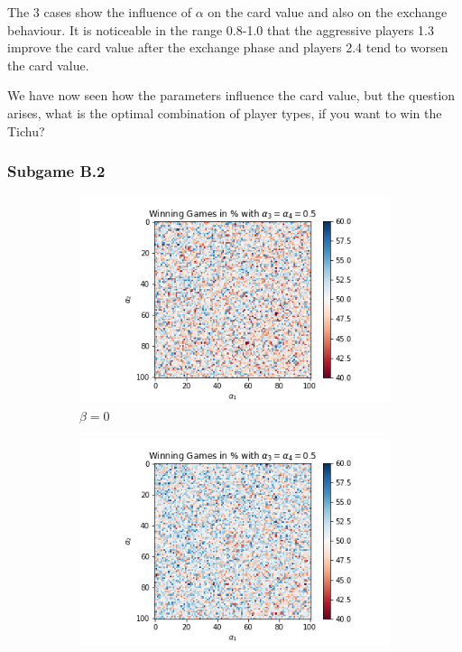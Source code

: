 The 3 cases show the influence of $\alpha$ on the card value and also on the exchange behaviour. It is noticeable in the range 0.8-1.0 that the aggressive players 1.3 improve the card value after the exchange phase and players 2.4 tend to worsen the card value.


We have now seen how the parameters influence the card value, but the question arises, what is the optimal combination of player types, if you want to win the Tichu?

\subsubsection{Subgame B.2}

\begin{figure}[!hb]
	\centering
	\begin{subfigure}{0.3\textwidth}
	    \centering
	    \includegraphics[width=1\linewidth]{Bilder/simulation_2_2}
	    \caption{$\beta=0$}
	    \label{fig:19}
    \end{subfigure}%
	\begin{subfigure}{0.3\textwidth}
	    \centering
	    \includegraphics[width=1\linewidth]{Bilder/simulation_3_2}

\end{subfigure}
\end{figure}
